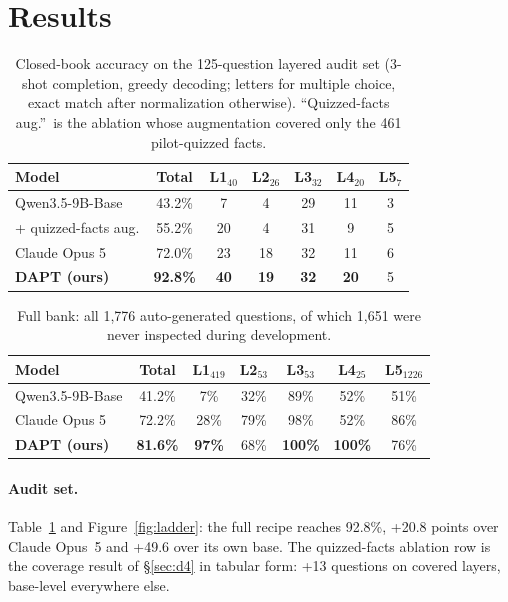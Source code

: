 \section{Results}
\label{sec:results}

\begin{table}[t]
\centering
\caption{Closed-book accuracy on the 125-question layered audit set (3-shot
completion, greedy decoding; letters for multiple choice, exact match after
normalization otherwise). ``Quizzed-facts aug.''\ is the ablation whose
augmentation covered only the 461 pilot-quizzed facts.}
\label{tab:subset}
\small
\setlength{\tabcolsep}{3.2pt}
\begin{tabular}{lcccccc}
\toprule
Model & Total & L1$_{40}$ & L2$_{26}$ & L3$_{32}$ & L4$_{20}$ & L5$_{7}$ \\
\midrule
Qwen3.5-9B-Base       & 43.2\% & 7  & 4  & 29 & 11 & 3 \\
\; + quizzed-facts aug. & 55.2\% & 20 & 4  & 31 & 9  & 5 \\
Claude Opus 5         & 72.0\% & 23 & 18 & 32 & 11 & 6 \\
\textbf{DAPT (ours)}  & \textbf{92.8\%} & \textbf{40} & \textbf{19} & \textbf{32} & \textbf{20} & 5 \\
\bottomrule
\end{tabular}
\end{table}

\begin{table}[t]
\centering
\caption{Full bank: all 1{,}776 auto-generated questions, of which 1{,}651
were never inspected during development.}
\label{tab:fullbank}
\small
\setlength{\tabcolsep}{2.6pt}
\begin{tabular}{lcccccc}
\toprule
Model & Total & L1$_{419}$ & L2$_{53}$ & L3$_{53}$ & L4$_{25}$ & L5$_{1226}$ \\
\midrule
Qwen3.5-9B-Base      & 41.2\% & 7\%  & 32\% & 89\% & 52\% & 51\% \\
Claude Opus 5        & 72.2\% & 28\% & 79\% & 98\% & 52\% & 86\% \\
\textbf{DAPT (ours)} & \textbf{81.6\%} & \textbf{97\%} & 68\% & \textbf{100\%} & \textbf{100\%} & 76\% \\
\bottomrule
\end{tabular}
\end{table}

\paragraph{Audit set.} Table~\ref{tab:subset} and Figure~\ref{fig:ladder}:
the full recipe reaches 92.8\%, +20.8 points over Claude Opus~5 and +49.6 over
its own base. The quizzed-facts ablation row is the coverage result of
\S\ref{sec:d4} in tabular form: +13 questions on covered layers, base-level
everywhere else.

